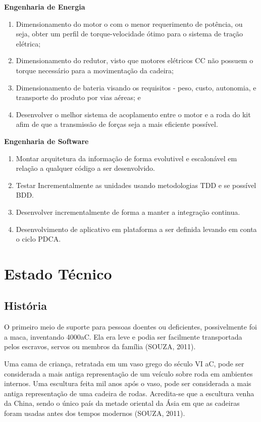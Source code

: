 \textbf{Engenharia de Energia}
  \begin{enumerate}
    \item Dimensionamento do motor o com o menor requerimento de potência, ou seja, obter um perfil de torque-velocidade ótimo para o sistema de tração elétrica;
    \item Dimensionamento do redutor, visto que motores elétricos CC não possuem o torque necessário para a movimentação da cadeira;
    \item Dimensionamento de bateria visando os requisitos - peso, custo, autonomia, e transporte do produto por vias aéreas; e
    \item Desenvolver o melhor sistema de acoplamento entre o motor e a roda do kit afim de que a transmissão de forças seja a mais eficiente possível.
  \end{enumerate}

\textbf{Engenharia de Software}
  \begin{enumerate}
    \item Montar arquitetura da informação de forma evolutivel e escalonável em relação a qualquer código a ser desenvolvido.
    \item Testar Incrementalmente as unidades usando metodologias TDD e se possível BDD.
    \item Desenvolver incrementalmente de forma a manter a integração continua.
    \item Desenvolvimento de aplicativo em plataforma a ser definida levando em conta o ciclo PDCA.
  \end{enumerate}

\section{Estado Técnico}

\subsection{História}
O primeiro meio de suporte para pessoas doentes ou deficientes, possivelmente foi a maca, inventando 4000aC. Ela era leve e podia ser facilmente transportada pelos escravos, servos ou membros da família (SOUZA, 2011).

Uma cama de criança, retratada em um vaso grego do século VI aC, pode ser considerada a mais antiga representação de um veículo sobre roda em ambientes internos. Uma escultura feita mil anos após o vaso, pode ser considerada a mais antiga representação de uma cadeira de rodas. Acredita-se que a escultura venha da China, sendo o único país da metade oriental da Ásia em que as cadeiras foram usadas antes dos tempos modernos (SOUZA, 2011).

